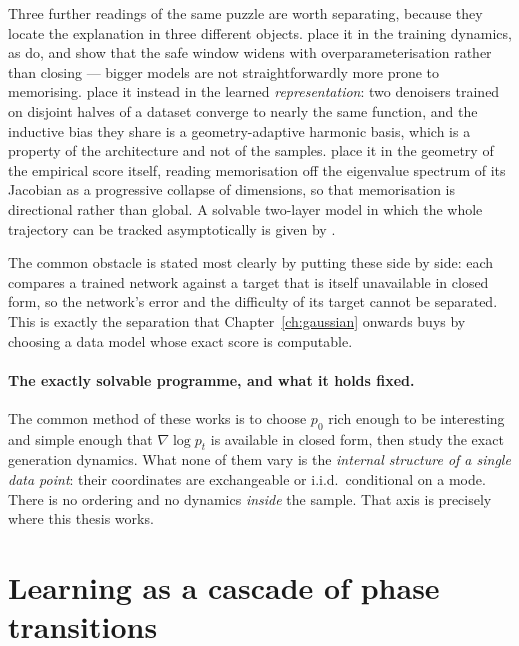 Three further readings of the same puzzle are worth separating, because
they locate the explanation in three different objects.
\citet{favero2025bigger} place it in the training dynamics, as
\citet{bonnaire2025memorize} do, and show that the safe window widens
with overparameterisation rather than closing --- bigger models are not
straightforwardly more prone to memorising.
\citet{kadkhodaie2024generalization} place it instead in the learned
\emph{representation}: two denoisers trained on disjoint halves of a
dataset converge to nearly the same function, and the inductive bias they
share is a geometry-adaptive harmonic basis, which is a property of the
architecture and not of the samples. \citet{achilli2024losing} place it
in the geometry of the empirical score itself, reading memorisation off
the eigenvalue spectrum of its Jacobian as a progressive collapse of
dimensions, so that memorisation is directional rather than global. A
solvable two-layer model in which the whole trajectory can be tracked
asymptotically is given by \citet{cui2025solvable}.

The common obstacle is stated most clearly by putting these side by
side: each compares a trained network against a target that is itself
unavailable in closed form, so the network's error and the difficulty of
its target cannot be separated. This is exactly the separation that
Chapter~\ref{ch:gaussian} onwards buys by choosing a data model whose
exact score is computable.

\paragraph{The exactly solvable programme, and what it holds fixed.} The
common method of these works is to choose $p_0$ rich enough to be
interesting and simple enough that $\nabla \log p_t$ is available in
closed form, then study the exact generation dynamics. What none of them
vary is the \emph{internal structure of a single data point}: their
coordinates are exchangeable or i.i.d.\ conditional on a mode. There is
no ordering and no dynamics \emph{inside} the sample. That axis is
precisely where this thesis works.

\section{Learning as a cascade of phase transitions}\label{sec:cascade}

